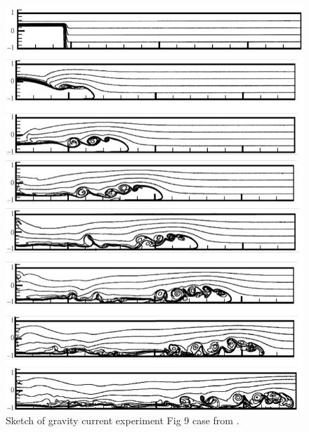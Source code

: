 \begin{figure}[htbp]
\includegraphics[width=5.5in]{../figures/GraCur/Maxworthy02JFM.pdf}
\caption{Sketch of gravity current experiment Fig 9 case from \cite{Maxworthy02}.}
\label{fig:Maxworthy02JFM}
\end{figure}

